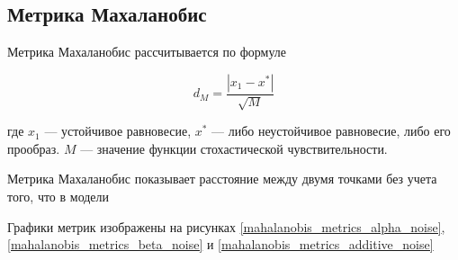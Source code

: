 \subsection{Метрика Махаланобис}
        

    Метрика Махаланобис рассчитывается по формуле 

    \[d_M = \frac{|x_1 - x^*|}{\sqrt{M}}\]
        
    где \(x_1\) --- устойчивое равновесие, \(x^*\) --- либо неустойчивое равновесие, либо его прообраз. \(M\) --- значение функции стохастической чувствительности.

    Метрика Махаланобис показывает расстояние между двумя точками без учета того, что в модели 

    Графики метрик изображены на рисунках \ref{mahalanobis_metrics_alpha_noise}, \ref{mahalanobis_metrics_beta_noise} и \ref{mahalanobis_metrics_additive_noise}

